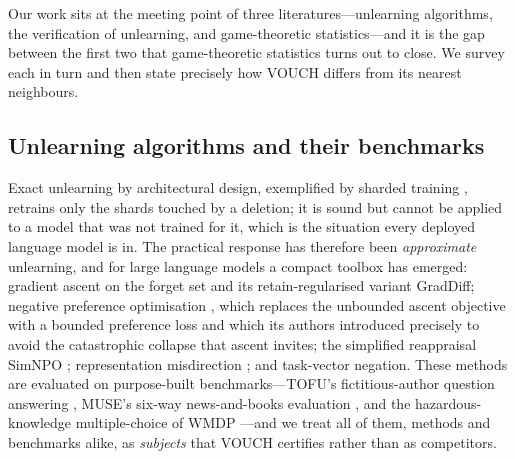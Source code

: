Our work sits at the meeting point of three literatures---unlearning algorithms,
the verification of unlearning, and game-theoretic statistics---and it is the gap
between the first two that game-theoretic statistics turns out to close. We survey
each in turn and then state precisely how VOUCH differs from its nearest neighbours.

\subsection{Unlearning algorithms and their benchmarks}

Exact unlearning by architectural design, exemplified by sharded training
\citep{bourtoule2021machine}, retrains only the shards touched by a deletion; it is
sound but cannot be applied to a model that was not trained for it, which is the
situation every deployed language model is in. The practical response has therefore
been \emph{approximate} unlearning, and for large language models a compact toolbox
has emerged: gradient ascent on the forget set and its retain-regularised variant
GradDiff; negative preference optimisation \citep{zhang2024npo}, which replaces the
unbounded ascent objective with a bounded preference loss and which its authors
introduced precisely to avoid the catastrophic collapse that ascent invites; the
simplified reappraisal SimNPO \citep{fan2025simnpo}; representation misdirection
\citep{li2024wmdp}; and task-vector negation. These methods are evaluated on
purpose-built benchmarks---TOFU's fictitious-author question answering
\citep{maini2024tofu}, MUSE's six-way news-and-books evaluation \citep{shi2024muse},
and the hazardous-knowledge multiple-choice of WMDP \citep{li2024wmdp}---and we treat
all of them, methods and benchmarks alike, as \emph{subjects} that VOUCH certifies
rather than as competitors.

